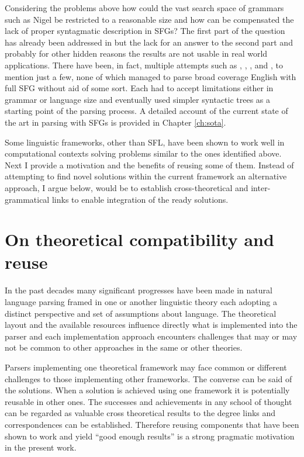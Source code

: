 Considering the problems above how could the vast search space of grammars such as Nigel be restricted to a reasonable size and how can be compensated the lack of proper syntagmatic description in SFGs? The first part of the question has already been addressed in \citet{ODonnell1993} but the lack for an answer to the second part and probably for other hidden reasons the results are not usable in real world applications. There have been, in fact, multiple attempts such as \citet{Kasper1988}, \citet{Kay1985}, \citet{ODonoghue1991a}, \citet{ODonnell1993} and \citet{Day2007}, to mention just a few, none of which managed to parse broad coverage English with full SFG without aid of some sort. Each had to accept limitations either in grammar or language size and eventually used simpler syntactic trees as a starting point of the parsing process. A detailed account of the current state of the art in parsing with SFGs is provided in Chapter \ref{ch:sota}. 

Some linguistic frameworks, other than SFL, have been shown to work well in computational contexts solving problems similar to the ones identified above. Next I provide a motivation and the benefits of reusing some of them. Instead of attempting to find novel solutions within the current framework an alternative approach, I argue below, would be to establish cross-theoretical and inter-grammatical links to enable integration of the ready solutions.

\section{On theoretical compatibility and reuse}
\label{sec:reuse}
In the past decades many significant progresses have been made in natural language parsing framed in one or another linguistic theory each adopting a distinct perspective and set of assumptions about language. The theoretical layout and the available resources influence directly what is implemented into the parser and each implementation approach encounters challenges that may or may not be common to other approaches in the same or other theories. 

Parsers implementing one theoretical framework may face common or different challenges to those implementing other frameworks. The converse can be said of the solutions. When a solution is achieved using one framework it is potentially reusable in other ones. The successes and achievements in any school of thought can be regarded as valuable cross theoretical results to the degree links and correspondences can be established. Therefore reusing components that have been shown to work and yield ``good enough results'' is a strong pragmatic motivation in the present work.

